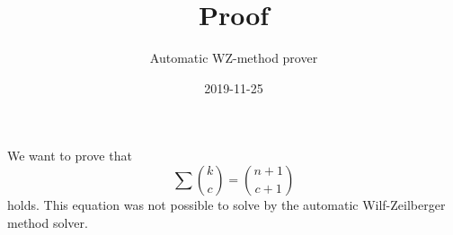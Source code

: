 \documentclass{article}
\title{Proof}
\author{Automatic WZ-method prover}
\date{2019-11-25}
\begin{document}
\maketitle
We want to prove that
\begin{equation}\label{Eq: 1}
\sum \binom{k}{c} = \binom{n+1}{c+1}
\end{equation}
holds. This equation was not possible to solve by the automatic Wilf-Zeilberger method solver.
\end{document}
